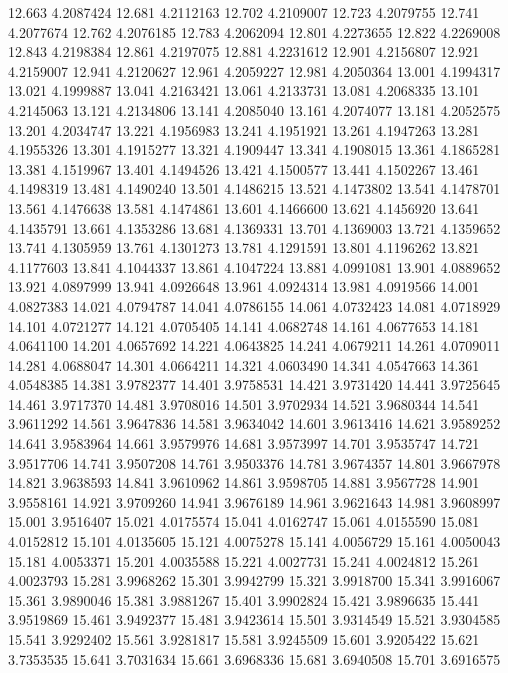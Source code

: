 12.663 4.2087424
12.681 4.2112163
12.702 4.2109007
12.723 4.2079755
12.741 4.2077674
12.762 4.2076185
12.783 4.2062094
12.801 4.2273655
12.822 4.2269008
12.843 4.2198384
12.861 4.2197075
12.881 4.2231612
12.901 4.2156807
12.921 4.2159007
12.941 4.2120627
12.961 4.2059227
12.981 4.2050364
13.001 4.1994317
13.021 4.1999887
13.041 4.2163421
13.061 4.2133731
13.081 4.2068335
13.101 4.2145063
13.121 4.2134806
13.141 4.2085040
13.161 4.2074077
13.181 4.2052575
13.201 4.2034747
13.221 4.1956983
13.241 4.1951921
13.261 4.1947263
13.281 4.1955326
13.301 4.1915277
13.321 4.1909447
13.341 4.1908015
13.361 4.1865281
13.381 4.1519967
13.401 4.1494526
13.421 4.1500577
13.441 4.1502267
13.461 4.1498319
13.481 4.1490240
13.501 4.1486215
13.521 4.1473802
13.541 4.1478701
13.561 4.1476638
13.581 4.1474861
13.601 4.1466600
13.621 4.1456920
13.641 4.1435791
13.661 4.1353286
13.681 4.1369331
13.701 4.1369003
13.721 4.1359652
13.741 4.1305959
13.761 4.1301273
13.781 4.1291591
13.801 4.1196262
13.821 4.1177603
13.841 4.1044337
13.861 4.1047224
13.881 4.0991081
13.901 4.0889652
13.921 4.0897999
13.941 4.0926648
13.961 4.0924314
13.981 4.0919566
14.001 4.0827383
14.021 4.0794787
14.041 4.0786155
14.061 4.0732423
14.081 4.0718929
14.101 4.0721277
14.121 4.0705405
14.141 4.0682748
14.161 4.0677653
14.181 4.0641100
14.201 4.0657692
14.221 4.0643825
14.241 4.0679211
14.261 4.0709011
14.281 4.0688047
14.301 4.0664211
14.321 4.0603490
14.341 4.0547663
14.361 4.0548385
14.381 3.9782377
14.401 3.9758531
14.421 3.9731420
14.441 3.9725645
14.461 3.9717370
14.481 3.9708016
14.501 3.9702934
14.521 3.9680344
14.541 3.9611292
14.561 3.9647836
14.581 3.9634042
14.601 3.9613416
14.621 3.9589252
14.641 3.9583964
14.661 3.9579976
14.681 3.9573997
14.701 3.9535747
14.721 3.9517706
14.741 3.9507208
14.761 3.9503376
14.781 3.9674357
14.801 3.9667978
14.821 3.9638593
14.841 3.9610962
14.861 3.9598705
14.881 3.9567728
14.901 3.9558161
14.921 3.9709260
14.941 3.9676189
14.961 3.9621643
14.981 3.9608997
15.001 3.9516407
15.021 4.0175574
15.041 4.0162747
15.061 4.0155590
15.081 4.0152812
15.101 4.0135605
15.121 4.0075278
15.141 4.0056729
15.161 4.0050043
15.181 4.0053371
15.201 4.0035588
15.221 4.0027731
15.241 4.0024812
15.261 4.0023793
15.281 3.9968262
15.301 3.9942799
15.321 3.9918700
15.341 3.9916067
15.361 3.9890046
15.381 3.9881267
15.401 3.9902824
15.421 3.9896635
15.441 3.9519869
15.461 3.9492377
15.481 3.9423614
15.501 3.9314549
15.521 3.9304585
15.541 3.9292402
15.561 3.9281817
15.581 3.9245509
15.601 3.9205422
15.621 3.7353535
15.641 3.7031634
15.661 3.6968336
15.681 3.6940508
15.701 3.6916575
